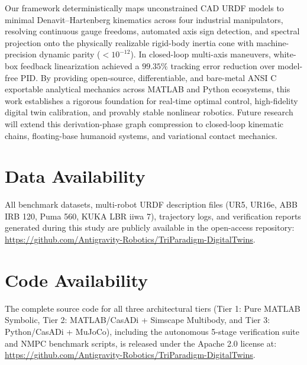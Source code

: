 \documentclass[fleqn,10pt]{article}
\begin{document}
	Our framework deterministically maps unconstrained CAD URDF models to minimal Denavit--Hartenberg kinematics across four industrial manipulators, resolving continuous gauge freedoms, automated axis sign detection, and spectral projection onto the physically realizable rigid-body inertia cone with machine-precision dynamic parity ($<10^{-12}$). In closed-loop multi-axis maneuvers, white-box feedback linearization achieved a $99.35\%$ tracking error reduction over model-free PID. By providing open-source, differentiable, and bare-metal ANSI C exportable analytical mechanics across MATLAB and Python ecosystems, this work establishes a rigorous foundation for real-time optimal control, high-fidelity digital twin calibration, and provably stable nonlinear robotics. Future research will extend this derivation-phase graph compression to closed-loop kinematic chains, floating-base humanoid systems, and variational contact mechanics.
	
	\section*{Data Availability}
	All benchmark datasets, multi-robot URDF description files (UR5, UR16e, ABB IRB 120, Puma 560, KUKA LBR iiwa 7), trajectory logs, and verification reports generated during this study are publicly available in the open-access repository: \url{https://github.com/Antigravity-Robotics/TriParadigm-DigitalTwins}.
	
	\section*{Code Availability}
	The complete source code for all three architectural tiers (Tier 1: Pure MATLAB Symbolic, Tier 2: MATLAB/CasADi + Simscape Multibody, and Tier 3: Python/CasADi + MuJoCo), including the autonomous 5-stage verification suite and NMPC benchmark scripts, is released under the Apache 2.0 license at: \url{https://github.com/Antigravity-Robotics/TriParadigm-DigitalTwins}.
	
	
	
	
\end{document}
